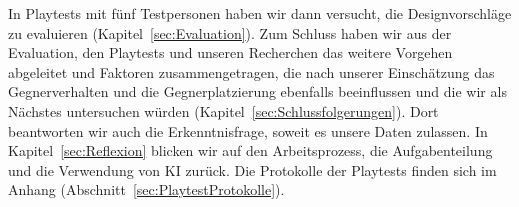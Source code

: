 \documentclass[../Main.tex]{subfiles}
\begin{document}
In Playtests mit fünf Testpersonen haben wir dann versucht, die Designvorschläge zu evaluieren (Kapitel~\ref{sec:Evaluation}). Zum Schluss haben wir aus der Evaluation, den Playtests und unseren Recherchen das weitere Vorgehen abgeleitet und Faktoren zusammengetragen, die nach unserer Einschätzung das Gegnerverhalten und die Gegnerplatzierung ebenfalls beeinflussen und die wir als Nächstes untersuchen würden (Kapitel~\ref{sec:Schlussfolgerungen}). Dort beantworten wir auch die Erkenntnisfrage, soweit es unsere Daten zulassen. In Kapitel~\ref{sec:Reflexion} blicken wir auf den Arbeitsprozess, die Aufgabenteilung und die Verwendung von KI zurück. Die Protokolle der Playtests finden sich im Anhang (Abschnitt~\ref{sec:PlaytestProtokolle}).

\newpage
\end{document}
